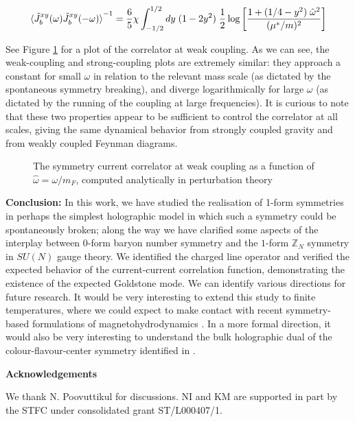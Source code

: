 \documentclass[aps,preprint,nofootinbib,preprintnumbers,eqsecnum,superscriptaddress]{revtex4}
\begin{document}
\begin{equation}
	\braket{\tilde{J}_b^{xy}(\omega)\tilde{J}_b^{xy}(-\omega)}^{-1}
	= \frac{6}{5} \chi \int_{-1/2}^{1/2} dy \; (1-2y^2) \; \frac{1}{2} \log \left[\frac{1 + (1/4-y^2)\; \hat{\omega}^2}{(\mu^*/m)^2}\right]
\end{equation}

See Figure \ref{Greens-analytic} for a plot of the correlator at weak coupling. As we can see, the weak-coupling and strong-coupling plots are extremely similar: they approach a constant for small $\omega$ in relation to the relevant mass scale (as dictated by the spontaneous symmetry breaking), and diverge logarithmically for large $\omega$ (as dictated by the running of the coupling at large frequencies). It is curious to note that these two properties appear to be sufficient to control the correlator at all scales, giving the same dynamical behavior from strongly coupled gravity and from weakly coupled Feynman diagrams. 

\begin{figure}[!ht]
	
	\caption{The symmetry current correlator at weak coupling as a function of $\hat{\omega} = \omega / m_F$, computed analytically in perturbation theory}
	\label{Greens-analytic}
\end{figure}

\vspace{0.2in}
{\bf Conclusion: } 
In this work, we have studied the realisation of 1-form symmetries in perhaps the simplest holographic model in which such a symmetry could be spontaneously broken; along the way we have clarified some aspects of the interplay between $0$-form baryon number symmetry and the $1$-form $\mathbb{Z}_{N}$ symmetry in $SU(N)$ gauge theory. We identified the charged line operator and verified the expected behavior of the current-current correlation function, demonstrating the existence of the expected Goldstone mode. We can identify various directions for future research. It would be very interesting to extend this study to finite temperatures, where we could expect to make contact with recent symmetry-based formulations of magnetohydrodynamics \cite{Grozdanov:2016tdf}. In a more formal direction, it would also be very interesting to understand the bulk holographic dual of the colour-flavour-center symmetry identified in \cite{Cherman:2017tey}. 


\vspace{0.2in}   \centerline{\bf{Acknowledgements}} \vspace{0.2in} We thank N. Poovuttikul for discussions. NI and KM are supported in part by the STFC under consolidated grant ST/L000407/1.  
\end{document}
